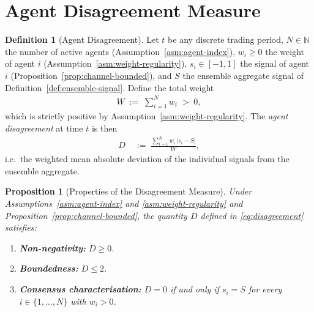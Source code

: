 \documentclass[12pt,openany]{book}
\numberwithin{equation}{chapter}
\theoremstyle{plain}
\newtheorem{proposition}[theorem]{Proposition}
\theoremstyle{definition}
\newtheorem{definition}[theorem]{Definition}
\theoremstyle{remark}
\numberwithin{equation}{chapter}
\theoremstyle{plain}
\begin{document}
\section{Agent Disagreement Measure}

\begin{definition}[Agent Disagreement]
\label{def:disagreement}
Let $t$ be any discrete trading period, $N \in \mathbb{N}$ the number
of active agents (Assumption~\ref{asm:agent-index}), $w_i \geq 0$
the weight of agent $i$
(Assumption~\ref{asm:weight-regularity}), $s_i \in [-1,1]$ the
signal of agent $i$
(Proposition~\ref{prop:channel-bounded}), and $S$ the ensemble
aggregate signal of Definition~\ref{def:ensemble-signal}.
Define the total weight
\begin{align}
  W \;:=\; \sum_{i=1}^{N} w_i \;>\; 0,
  \label{eq:disagreement-W}
\end{align}
which is strictly positive by
Assumption~\ref{asm:weight-regularity}.
The \emph{agent disagreement} at time $t$ is then
\begin{align}
  D
  \;&:=\;
  \frac{\displaystyle\sum_{i=1}^{N} w_i \,\bigl|s_i - S\bigr|}{W},
  \label{eq:disagreement}
\end{align}
i.e.\ the weighted mean absolute deviation of the individual
signals from the ensemble aggregate.
\end{definition}

\begin{proposition}[Properties of the Disagreement Measure]
\label{prop:disagreement-props}
Under Assumptions~\ref{asm:agent-index} and
\ref{asm:weight-regularity} and
Proposition~\ref{prop:channel-bounded}, the quantity $D$ defined
in \eqref{eq:disagreement} satisfies:
\begin{enumerate}
  \item \textbf{Non-negativity:} $D \geq 0$.
  \item \textbf{Boundedness:} $D \leq 2$.
  \item \textbf{Consensus characterisation:} $D = 0$ if and only
        if $s_i = S$ for every $i \in \{1,\ldots,N\}$ with
        $w_i > 0$.
\end{enumerate}
\end{proposition}
\end{document}
